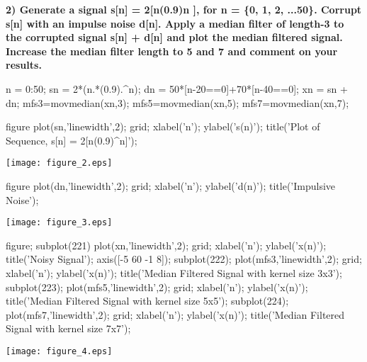 \documentclass[12pt, onecolumn]{IEEEtran}
\begin{document}
\begin{par}
	\begin{flushleft}
		\textbf{2) Generate a signal s[n] = 2[n(0.9)n ], for n = \{0, 1, 2, ...50\}. Corrupt s[n] with an impulse noise d[n]. Apply a median filter of length-3 to the corrupted signal s[n] + d[n] and plot the median filtered signal. Increase the median filter length to 5 and 7 and comment on your results.}
	\end{flushleft}
\end{par}

\begin{matlabcode}
	n = 0:50; %
	sn = 2*(n.*(0.9).^n); %
	dn = 50*[n-20==0]+70*[n-40==0]; %
	xn = sn + dn; %
	mfs3=movmedian(xn,3);
	mfs5=movmedian(xn,5);
	mfs7=movmedian(xn,7);
	
	figure
	plot(sn,'linewidth',2); grid; %
	xlabel('n'); 
	ylabel('s(n)');
	title('Plot of Sequence, s[n] = 2[n(0.9)^n]');
\end{matlabcode}
\begin{center}
	\texttt{[image: figure\_2.eps]}
\end{center}
\begin{matlabcode}
	
	figure
	plot(dn,'linewidth',2); grid; %
	xlabel('n'); 
	ylabel('d(n)');
	title('Impulsive Noise');
\end{matlabcode}
\begin{center}
	\texttt{[image: figure\_3.eps]}
\end{center}
\begin{matlabcode}
	
	figure; 
	subplot(221)
	plot(xn,'linewidth',2); grid; %
	xlabel('n'); 
	ylabel('x(n)');
	title('Noisy Signal');
	axis([-5 60 -1 8]);
	subplot(222);
	plot(mfs3,'linewidth',2); grid; %
	xlabel('n'); 
	ylabel('x(n)');
	title('Median Filtered Signal with kernel size 3x3');
	subplot(223);
	plot(mfs5,'linewidth',2); grid; %
	xlabel('n'); 
	ylabel('x(n)');
	title('Median Filtered Signal with kernel size 5x5');
	subplot(224);
	plot(mfs7,'linewidth',2); grid; %
	xlabel('n'); 
	ylabel('x(n)');
	title('Median Filtered Signal with kernel size 7x7');
\end{matlabcode}
\begin{center}
	\texttt{[image: figure\_4.eps]}
\end{center}
\end{document}
